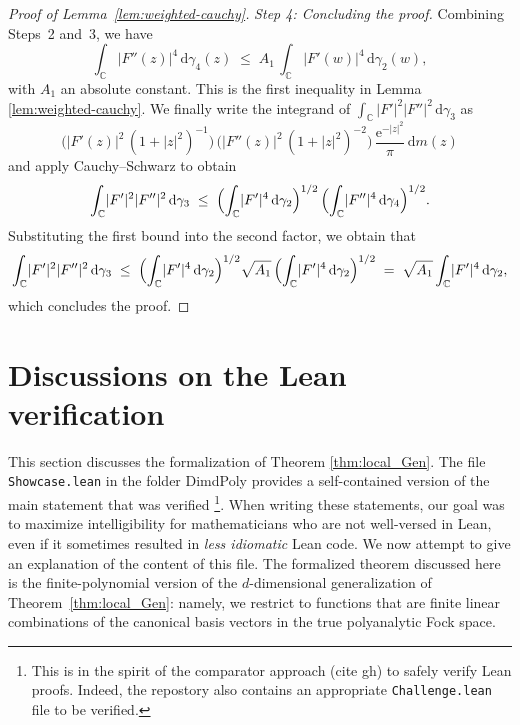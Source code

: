 \documentclass[11pt]{amsart}
\newcommand{\inlean}[1]{{\scriptsize \texttt{#1}}}
\theoremstyle{remark}
\newcommand{\C}{\mathbb{C}}
\newcommand{\abs}[1]{\lvert #1 \rvert}
\newcommand{\dd}{\mathrm{d}}
\newcommand{\ee}{\mathrm{e}}
\begin{document}
\begin{proof}[Proof of Lemma~\ref{lem:weighted-cauchy}]
\noindent\emph{Step 4: Concluding the proof.}\;
Combining Steps~2 and~3, we have
\[
\int_{\C}\abs{F''(z)}^{4}\,\dd\gamma_{4}(z)
\;\le\;
A_{1}\,\int_{\C}\abs{F'(w)}^{4}\,\dd\gamma_{2}(w),
\]
with $A_{1}$ an absolute constant. This is the first inequality in Lemma \ref{lem:weighted-cauchy}. We finally write the integrand of
$\int_{\C}\abs{F'}^{2}\abs{F''}^{2}\,\dd\gamma_{3}$ as
\[
\bigl(\abs{F'(z)}^{2}\,(1+\abs{z}^{2})^{-1}\bigr)\,
\bigl(\abs{F''(z)}^{2}\,(1+\abs{z}^{2})^{-2}\bigr)\,
\frac{\ee^{-\abs{z}^{2}}}{\pi}\,\dd m(z)
\]
and apply Cauchy--Schwarz to obtain
\[
\int_{\C}\abs{F'}^{2}\abs{F''}^{2}\,\dd\gamma_{3}
\;\le\;
\Bigl(\int_{\C}\abs{F'}^{4}\,\dd\gamma_{2}\Bigr)^{1/2}\,
\Bigl(\int_{\C}\abs{F''}^{4}\,\dd\gamma_{4}\Bigr)^{1/2}.
\]
Substituting the first bound into the second factor, we obtain that
\[
\int_{\C}\abs{F'}^{2}\abs{F''}^{2}\,\dd\gamma_{3}
\;\le\;
\Bigl(\int_{\C}\abs{F'}^{4}\,\dd\gamma_{2}\Bigr)^{1/2}
\sqrt{A_{1}}\,\Bigl(\int_{\C}\abs{F'}^{4}\,\dd\gamma_{2}\Bigr)^{1/2}
\;=\;
\sqrt{A_{1}}\int_{\C}\abs{F'}^{4}\,\dd\gamma_{2},
\]
which concludes the proof.
\end{proof}

\section{Discussions on the Lean verification}\label{App}


This section discusses the formalization of Theorem \ref{thm:local_Gen}. The file \inlean{Showcase.lean} in the folder DimdPoly provides a self-contained version of the main statement that was verified \footnote{This is in the spirit of the comparator approach {\color{red}(cite gh)} to safely verify Lean proofs. Indeed, the repostory also contains an appropriate \inlean{Challenge.lean} file to be verified.}. When writing these statements, our goal was to maximize intelligibility for mathematicians who are not well-versed in Lean, even if it sometimes resulted in \emph{less idiomatic} Lean code. \medskip
We now attempt to give an explanation of the content of this file.  The
formalized theorem discussed here is the finite-polynomial version of the $d$-dimensional generalization of
Theorem~\ref{thm:local_Gen}: namely, we restrict to functions that are finite linear combinations of
the canonical basis vectors in the  true polyanalytic Fock space.\medskip

\theoremstyle{plain}
\newtheorem*{theorem*}{Theorem}
\end{document}
